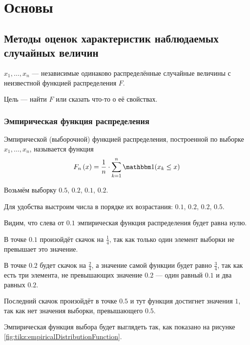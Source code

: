 \chapter{Основы}
\section{Методы оценок характеристик наблюдаемых случайных величин}
$x_1, \dots, x_n$ --- независимые одинаково распределённые случайные величины
с неизвестной функцией распределения $F$.

Цель --- найти $F$ или сказать что-то о её свойствах.

\subsection{Эмпирическая функция распределения}
\begin{definition}
  Эмпирической (выборочной) функцией распределения,
  построенной по выборке $x_1, \dots, x_n$, называется функция
  $$\cdfn{x}=\frac{1}{n}\cdot \sum_{k=1}^n
  \indicator{x_k\le x}$$
\end{definition}

\begin{example}
  \label{ex:empiricalDistributionFunction}
  Возьмём выборку $0.5$, $0.2$, $0.1$, $0.2$.

  Для удобства выстроим числа в порядке их возрастания:
  $0.1$, $0.2$, $0.2$, $0.5$.

  Видим, что слева от $0.1$ эмпирическая функция распределения будет равна
  нулю.

  В точке $0.1$ произойдёт скачок на $\frac{1}{4}$, так как только один
  элемент выборки не превышает это значение.

  В точке $0.2$ будет скачок на $\frac{2}{4}$, а значение самой функции
  будет равно $\frac{3}{4}$, так как есть три элемента, не превышающих
  значение $0.2$ --- один равный $0.1$ и два равных $0.2$.

  Последний скачок произойдёт в точке $0.5$ и тут функция достигнет
  значения $1$, так как нет значения выборки, превышающего
  $0.5$.

  Эмпирическая функция выбора будет выглядеть так, как показано на
  рисунке \ref{fig:tikz:empiricalDistributionFunction}.
\end{example}

